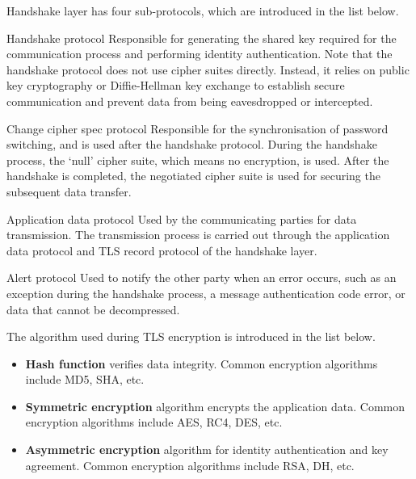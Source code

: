 \documentclass[a4paper,12pt]{book}
\begin{document}
Handshake layer has four sub-protocols, which are introduced in the list below.

\begin{term}{Handshake protocol}
    Responsible for generating the shared key required for the communication process and performing identity authentication. Note that the handshake protocol does not use cipher suites directly. Instead, it relies on public key cryptography or Diffie-Hellman key exchange to establish secure communication and prevent data from being eavesdropped or intercepted.
\end{term}

\begin{term}{Change cipher spec protocol}
    Responsible for the synchronisation of password switching, and is used after the handshake protocol. During the handshake process, the ‘null’ cipher suite, which means no encryption, is used. After the handshake is completed, the negotiated cipher suite is used for securing the subsequent data transfer.
\end{term}

\begin{term}{Application data protocol}
    Used by the communicating parties for data transmission. The transmission process is carried out through the application data protocol and TLS record protocol of the handshake layer.
\end{term}

\begin{term}{Alert protocol}
    Used to notify the other party when an error occurs, such as an exception during the handshake process, a message authentication code error, or data that cannot be decompressed.
\end{term}

The algorithm used during TLS encryption is introduced in the list below.

\begin{itemize}[noitemsep]
    \item \textbf{Hash function} verifies data integrity. Common encryption algorithms include MD5, SHA, etc.
    \item \textbf{Symmetric encryption} algorithm encrypts the application data. Common encryption algorithms include AES, RC4, DES, etc.
    \item \textbf{Asymmetric encryption} algorithm for identity authentication and key agreement. Common encryption algorithms include RSA, DH, etc.
\end{itemize}
\end{document}
